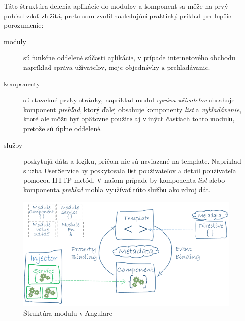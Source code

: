 \documentclass[
  digital, %
  twoside, %
  notable,   %
  nolof,   %
  nolot,   %
]{fithesis3}
\begin{document}
Táto štruktúra delenia aplikácie do modulov a komponent sa môže na prvý pohľad zdať zložitá, preto som zvolil nasledujúci praktický príklad pre lepšie porozumenie:
\begin{description}
\item[moduly] sú funkčne oddelené súčasti aplikácie, v prípade internetového obchodu napríklad správa užívateľov, moje objednávky a prehľadávanie.
\item[komponenty] sú stavebné prvky stránky, napríklad modul \textit{správa užívateľov} obsahuje komponent \textit{prehľad}, ktorý ďalej obsahuje komponenty \textit{list} a \textit{vyhľadávanie}, ktoré ale môžu byť opätovne použité aj v iných častiach tohto modulu, pretože sú úplne oddelené.
\item[služby] poskytujú dáta a logiku, pričom nie sú naviazané na template. Napríklad služba UserService by poskytovala list používateľov a detail používateľa pomocou HTTP metód. V našom prípade by komponenta \textit{list} alebo komponenta \textit{prehľad} mohla využívať túto službu ako zdroj dát.
\end{description}

\begin{figure}[H]
	\center
	\includegraphics[width=1.0\linewidth]{angular_architecture}
	\caption{Štruktúra modulu v Angulare\cite{angular}}
	\label{angular_architecture}
\end{figure}
\end{document}
